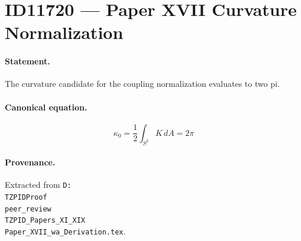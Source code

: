 \section*{ID11720 --- Paper XVII Curvature Normalization}

\paragraph{Statement.}
The curvature candidate for the coupling normalization evaluates to two pi.

\paragraph{Canonical equation.}
\[
\kappa_0=\frac{1}{2}\int_{S^2}K\,dA=2\pi
\]

\paragraph{Provenance.}
Extracted from \texttt{D:\\TZPIDProof\\peer\_review\\TZPID\_Papers\_XI\_XIX\\Paper\_XVII\_wa\_Derivation.tex}.
